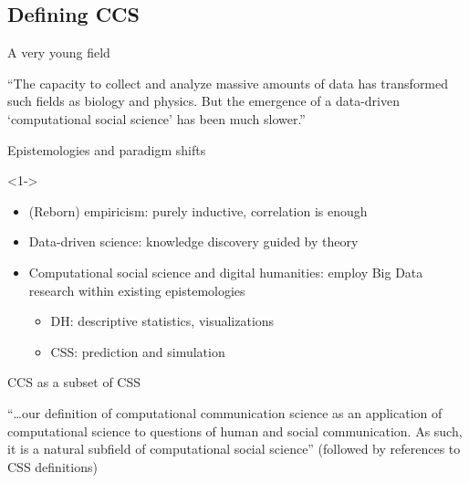


\subsection{Defining CCS}



\begin{frame}{A very young field}
	\begin{block}{\textcite{Lazer2009}}
		``The capacity to collect and analyze massive amounts of data has transformed such fields as biology and physics. But the emergence of a data-driven `computational social science' has been much slower.''
	\end{block}
\end{frame}




\begin{frame}{Epistemologies and paradigm shifts}
	\begin{block}{\textcite{Kitchin2014}}<1->
		\begin{itemize}
			\item<2-> (Reborn) empiricism: purely inductive, correlation is enough
			\item<3-> Data-driven science: knowledge discovery guided by theory
			\item<4-> Computational social science and digital humanities: employ Big Data research within existing epistemologies
			\begin{itemize}
				\item DH: descriptive statistics, visualizations
				\item CSS: prediction and simulation
			\end{itemize}
		\end{itemize}
	\end{block}
\end{frame}




\begin{frame}{CCS as a subset of CSS}
	\begin{block}{\textcite{Hilbert2019}}
		``\ldots our definition of computational communication science as an application of computational science to questions of human and social communication. As such, it is a natural subfield of computational social science'' (followed by references to CSS definitions)
	\end{block}
\end{frame}



